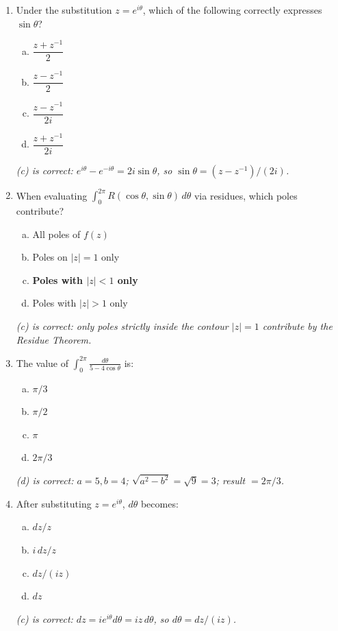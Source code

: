 \documentclass[12pt,a4paper]{article}
\begin{document}
\begin{enumerate}

\item Under the substitution $z = e^{i\theta}$, which of the following correctly
      expresses $\sin\theta$?
  \begin{enumerate}[(a)]
    \item $\dfrac{z+z^{-1}}{2}$
    \item $\dfrac{z-z^{-1}}{2}$
    \item \textbf{$\dfrac{z-z^{-1}}{2i}$}
    \item $\dfrac{z+z^{-1}}{2i}$
  \end{enumerate}
  \textit{(c) is correct: $e^{i\theta} - e^{-i\theta} = 2i\sin\theta$, so $\sin\theta = (z-z^{-1})/(2i)$.}

\item When evaluating $\displaystyle\int_0^{2\pi}R(\cos\theta,\sin\theta)\,d\theta$
      via residues, which poles contribute?
  \begin{enumerate}[(a)]
    \item All poles of $f(z)$
    \item Poles on $|z| = 1$ only
    \item \textbf{Poles with $|z| < 1$ only}
    \item Poles with $|z| > 1$ only
  \end{enumerate}
  \textit{(c) is correct: only poles strictly inside the contour $|z|=1$
  contribute by the Residue Theorem.}

\item The value of $\displaystyle\int_0^{2\pi}\frac{d\theta}{5-4\cos\theta}$ is:
  \begin{enumerate}[(a)]
    \item $\pi/3$
    \item $\pi/2$
    \item $\pi$
    \item \textbf{$2\pi/3$}
  \end{enumerate}
  \textit{(d) is correct: $a=5,b=4$; $\sqrt{a^2-b^2}=\sqrt{9}=3$; result $=2\pi/3$.}

\item After substituting $z = e^{i\theta}$, $d\theta$ becomes:
  \begin{enumerate}[(a)]
    \item $dz/z$
    \item $i\,dz/z$
    \item \textbf{$dz/(iz)$}
    \item $dz$
  \end{enumerate}
  \textit{(c) is correct: $dz = ie^{i\theta}d\theta = iz\,d\theta$, so $d\theta = dz/(iz)$.}


\end{enumerate}
\end{document}
